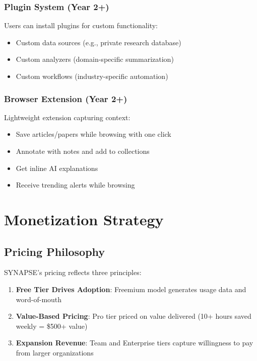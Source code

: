 \documentclass{report}
\begin{document}
\subsection{Plugin System (Year 2+)}

Users can install plugins for custom functionality:
\begin{itemize}
    \item Custom data sources (e.g., private research database)
    \item Custom analyzers (domain-specific summarization)
    \item Custom workflows (industry-specific automation)
\end{itemize}

\subsection{Browser Extension (Year 2+)}

Lightweight extension capturing context:
\begin{itemize}
    \item Save articles/papers while browsing with one click
    \item Annotate with notes and add to collections
    \item Get inline AI explanations
    \item Receive trending alerts while browsing
\end{itemize}

\newpage

\chapter{Monetization Strategy}

\section{Pricing Philosophy}

SYNAPSE's pricing reflects three principles:

\begin{enumerate}
    \item \textbf{Free Tier Drives Adoption}: Freemium model generates usage data and word-of-mouth
    \item \textbf{Value-Based Pricing}: Pro tier priced on value delivered (10+ hours saved weekly = \$500+ value)
    \item \textbf{Expansion Revenue}: Team and Enterprise tiers capture willingness to pay from larger organizations
\end{enumerate}
\end{document}
